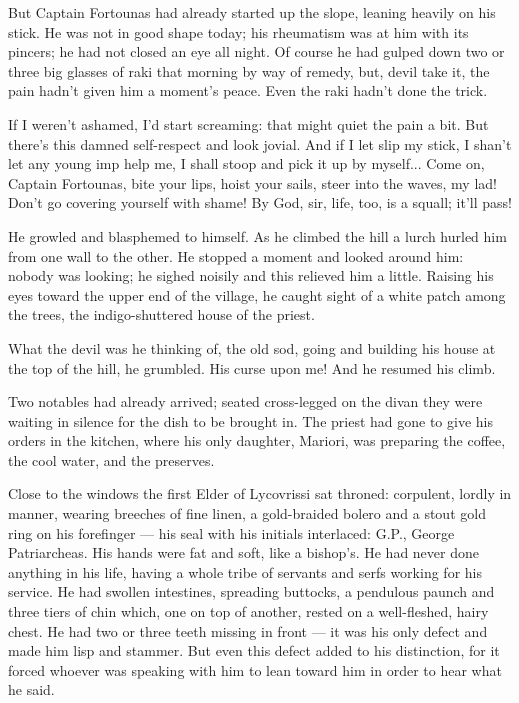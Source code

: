 \documentclass[diploma]{softlab-thesis}
\begin{document}
But Captain Fortounas had already started up the slope, leaning heavily on
his stick. He was not in good shape today; his rheumatism was at him with
its pincers; he had not closed an eye all night. Of course he had gulped
down two or three big glasses of raki that morning by way of remedy, but,
devil take it, the pain hadn’t given him a moment’s peace. Even the raki
hadn’t done the trick.

If I weren’t ashamed, I’d start screaming: that might quiet the pain a
bit. But there’s this damned self-respect and look jovial. And if I let slip
my stick, I shan’t let any young imp help me, I shall stoop and pick it up
by myself... Come on, Captain Fortounas, bite your lips, hoist your sails,
steer into the waves, my lad! Don’t go covering yourself with shame! By God,
sir, life, too, is a squall; it’ll pass!

He growled and blasphemed to himself. As he climbed the hill a lurch hurled
him from one wall to the other. He stopped a moment and looked around him:
nobody was looking; he sighed noisily and this relieved him a
little. Raising his eyes toward the upper end of the village, he caught
sight of a white patch among the trees, the indigo-shuttered house of the
priest.

What the devil was he thinking of, the old sod, going and building his house
at the top of the hill, he grumbled. His curse upon me! And he resumed his
climb.

Two notables had already arrived; seated cross-legged on the divan they were
waiting in silence for the dish to be brought in. The priest had gone to
give his orders in the kitchen, where his only daughter, Mariori, was
preparing the coffee, the cool water, and the preserves.

Close to the windows the first Elder of Lycovrissi sat throned: corpulent,
lordly in manner, wearing breeches of fine linen, a gold-braided bolero and
a stout gold ring on his forefinger --- his seal with his initials
interlaced: G.P., George Patriarcheas. His hands were fat and soft, like a
bishop’s. He had never done anything in his life, having a whole tribe of
servants and serfs working for his service. He had swollen intestines,
spreading buttocks, a pendulous paunch and three tiers of chin which, one on
top of another, rested on a well-fleshed, hairy chest. He had two or three
teeth missing in front --- it was his only defect and made him lisp and
stammer. But even this defect added to his distinction, for it forced
whoever was speaking with him to lean toward him in order to hear what he
said.
\end{document}
